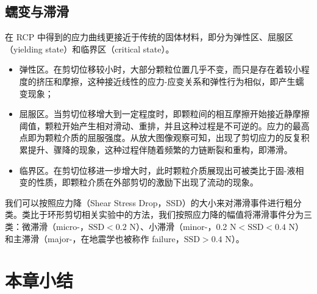 \subsection{蠕变与滞滑}

在 RCP 中得到的应力曲线更接近于传统的固体材料，即分为弹性区、屈服区（yielding state）和临界区（critical state）。

\begin{itemize}
  \item 弹性区。在剪切位移较小时，大部分颗粒位置几乎不变，而只是存在着较小程度的挤压和摩擦，这种接近线性的应力-应变关系和弹性行为相似，即产生蠕变现象；
  \item 屈服区。当剪切位移增大到一定程度时，即颗粒间的相互摩擦开始接近静摩擦阈值，颗粒开始产生相对滑动、重排，并且这种过程是不可逆的。应力的最高点即为颗粒介质的屈服强度。从放大图像观察可知，出现了剪切应力的反复积累提升、骤降的现象，这种过程伴随着频繁的力链断裂和重构，即滞滑。
  \item 临界区。在剪切位移进一步增大时，此时颗粒介质展现出可被类比于固-液相变的性质，即颗粒介质在外部剪切的激励下出现了流动的现象。
\end{itemize}

我们可以按照应力降（Shear Stress Drop，SSD）的大小来对滞滑事件进行粗分类。类比于环形剪切相关实验中的方法，我们按照应力降的幅值将滞滑事件分为三类：微滞滑（micro-，$\text{SSD}<0.2$ \unit{\newton}）、小滞滑（minor-，0.2 \unit{\newton}$<\text{SSD}<0.4$ \unit{\newton}）和主滞滑（major-，在地震学也被称作 failure，$\text{SSD}>0.4$ \unit{\newton}）。

\section{本章小结}